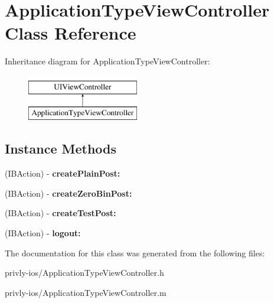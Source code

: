 \hypertarget{interface_application_type_view_controller}{\section{Application\-Type\-View\-Controller Class Reference}
\label{interface_application_type_view_controller}
}
Inheritance diagram for Application\-Type\-View\-Controller\-:\begin{figure}[H]
\begin{center}
\leavevmode
\includegraphics[height=2.000000cm]{interface_application_type_view_controller}
\end{center}
\end{figure}
\subsection*{Instance Methods}
\begin{DoxyCompactItemize}
\item 
\hypertarget{interface_application_type_view_controller_a9d9b997a57bb60fb2b52ec5014aad7c5}{(I\-B\-Action) -\/ {\bfseries create\-Plain\-Post\-:}}\label{interface_application_type_view_controller_a9d9b997a57bb60fb2b52ec5014aad7c5}

\item 
\hypertarget{interface_application_type_view_controller_a0f601aea82d2c60b2180a9846bad2426}{(I\-B\-Action) -\/ {\bfseries create\-Zero\-Bin\-Post\-:}}\label{interface_application_type_view_controller_a0f601aea82d2c60b2180a9846bad2426}

\item 
\hypertarget{interface_application_type_view_controller_adbdb011a5af34dcb65bbc0c7204d7f87}{(I\-B\-Action) -\/ {\bfseries create\-Test\-Post\-:}}\label{interface_application_type_view_controller_adbdb011a5af34dcb65bbc0c7204d7f87}

\item 
\hypertarget{interface_application_type_view_controller_a713c8146614cb2cba9b3dc3482ca7992}{(I\-B\-Action) -\/ {\bfseries logout\-:}}\label{interface_application_type_view_controller_a713c8146614cb2cba9b3dc3482ca7992}

\end{DoxyCompactItemize}


The documentation for this class was generated from the following files\-:\begin{DoxyCompactItemize}
\item 
privly-\/ios/Application\-Type\-View\-Controller.\-h\item 
privly-\/ios/Application\-Type\-View\-Controller.\-m\end{DoxyCompactItemize}
